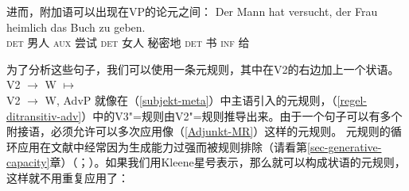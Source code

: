 \z
进而，附加语可以出现在VP的论元之间：
\ea
\gll Der Mann hat versucht, der Frau heimlich das Buch zu geben.\\
	\textsc{det} 男人 \textsc{aux} 尝试 \textsc{det} 女人 秘密地 \textsc{det} 书 \textsc{inf} 给\\
\z 

\noindent
为了分析这些句子，我们可以使用一条元规则，其中在V2的右边加上一个状语\citep[]{Uszkoreit87a}。
\ea
\label{Adjunkt-MR}
V2  $\to$ W $\mapsto$\\
V2  $\to$ W, AdvP
\z 
就像在（\ref{subjekt-meta}）中主语引入的元规则，（\ref{regel-ditransitiv-adv}）中的V3"=规则由V2"=规则推导出来。由于一个句子可以有多个附接语，必须允许可以多次应用像（\ref{Adjunkt-MR}）这样的元规则。
元规则的循环应用在文献中经常因为生成能力过强而被规则排除（请看第\ref{sec-generative-capacity}章）（\citealp{Thompson82a-u}；\citealp[]{Uszkoreit87a}）。如果我们用Kleene星号\isc{*}\is{*}表示，那么就可以构成状语的元规则，这样就不用重复应用了\citep[]{Uszkoreit87a}：

